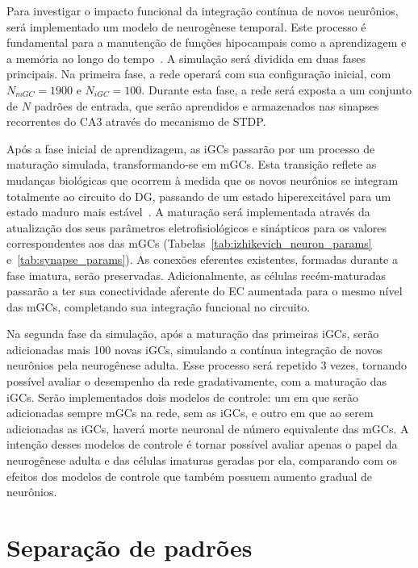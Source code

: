Para investigar o impacto funcional da integração contínua de novos neurônios, será implementado um modelo de neurogênese
temporal. Este processo é fundamental para a manutenção de funções hipocampais como a aprendizagem e a memória ao longo do
tempo~\cite{aimoneRegulation2014, berdugo-vegaSharpening2023}. A simulação será dividida em duas fases principais. Na primeira
fase, a rede operará com sua configuração inicial, com $N_{mGC} = 1900$ e $N_{iGC} = 100$. Durante esta fase, a rede será exposta
a um conjunto de $N$ padrões de entrada, que serão aprendidos e armazenados nas sinapses recorrentes do CA3 através do mecanismo
de STDP.

Após a fase inicial de aprendizagem, as iGCs passarão por um processo de maturação simulada, transformando-se em mGCs. Esta
transição reflete as mudanças biológicas que ocorrem à medida que os novos neurônios se integram totalmente ao circuito do DG,
passando de um estado hiperexcitável para um estado maduro mais estável~\cite{abbottAdult2020}. A maturação será implementada
através da atualização dos seus parâmetros eletrofisiológicos e sinápticos para os valores correspondentes aos das mGCs
(Tabelas~\ref{tab:izhikevich_neuron_params} e~\ref{tab:synapse_params}). As conexões eferentes existentes, formadas durante a fase
imatura, serão preservadas. Adicionalmente, as células recém-maturadas passarão a ter sua conectividade aferente do EC aumentada
para o mesmo nível das mGCs, completando sua integração funcional no circuito.

Na segunda fase da simulação, após a maturação das primeiras iGCs, serão adicionadas mais 100 novas iGCs, simulando a contínua
integração de novos neurônios pela neurogênese adulta. Esse processo será repetido 3 vezes, tornando possível avaliar o desempenho
da rede gradativamente, com a maturação das iGCs. Serão implementados dois modelos de controle: um em que serão adicionadas sempre
mGCs na rede, sem as iGCs, e outro em que ao serem adicionadas as iGCs, haverá morte neuronal de número equivalente das mGCs. A
intenção desses modelos de controle é tornar possível avaliar apenas o papel da neurogênese adulta e das células imaturas geradas
por ela, comparando com os efeitos dos modelos de controle que também possuem aumento gradual de neurônios.


\section{Separação de padrões}\label{sec:separacao_padroes}

